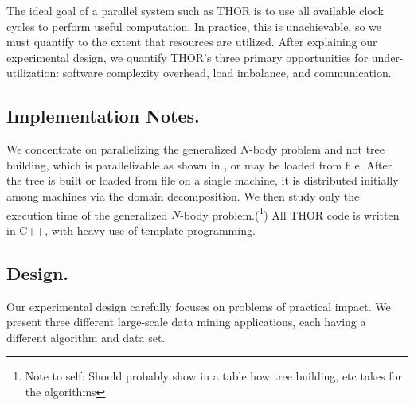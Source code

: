 \documentclass[twoside,leqno,twocolumn]{article}
\newcommand{\authornote}[1]{(\footnote{Note to self: #1})}
\newcommand{\authorsnote}[1]{\authornote{#1}}
\newcommand{\mysub}[1]{\subsection{#1.}}
\begin{document}
The ideal goal of a parallel system such as THOR is to use all available clock cycles to perform useful computation.
In practice, this is unachievable, so we must quantify to the extent that resources are utilized.
After explaining our experimental design, we quantify THOR's three primary opportunities for under-utilization: software complexity overhead, load imbalance, and communication.

\mysub{Implementation Notes}

We concentrate on parallelizing the generalized $N$-body problem and not tree building, which is parallelizable as shown in \cite{alfuraih00parallel}, or may be loaded from file.
After the tree is built or loaded from file on a single machine, it is distributed initially among machines via the domain decomposition.
We then study only the execution time of the generalized $N$-body problem.\authorsnote{Should probably show in a table how tree building, etc takes for the algorithms}
All THOR code is written in C++, with heavy use of template programming.

\mysub{Design}


Our experimental design carefully focuses on problems of practical impact.
We present three different large-scale data mining applications, each having a different algorithm and data set.


%
%
%
\end{document}

